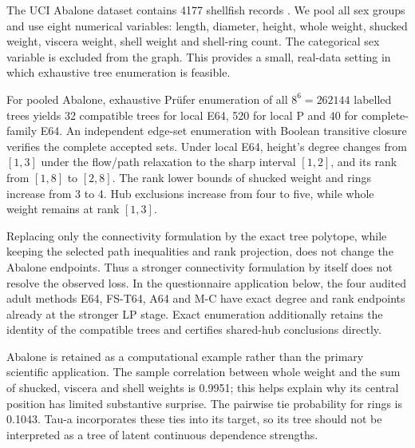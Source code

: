 The UCI Abalone dataset contains 4177 shellfish records \citep{abalone1994}. We pool all sex groups and use eight numerical variables: length, diameter, height, whole weight, shucked weight, viscera weight, shell weight and shell-ring count. The categorical sex variable is excluded from the graph. This provides a small, real-data setting in which exhaustive tree enumeration is feasible.

For pooled Abalone, exhaustive Pr\"ufer enumeration of all $8^6=262144$ labelled trees yields 32 compatible trees for local E64, 520 for local P and 40 for complete-family E64. An independent edge-set enumeration with Boolean transitive closure verifies the complete accepted sets. Under local E64, height's degree changes from $[1,3]$ under the flow/path relaxation to the sharp interval $[1,2]$, and its rank from $[1,8]$ to $[2,8]$. The rank lower bounds of shucked weight and rings increase from 3 to 4. Hub exclusions increase from four to five, while whole weight remains at rank $[1,3]$.

Replacing only the connectivity formulation by the exact tree polytope, while keeping the selected path inequalities and rank projection, does not change the Abalone endpoints. Thus a stronger connectivity formulation by itself does not resolve the observed loss. In the questionnaire application below, the four audited adult methods E64, FS-T64, A64 and M-C have exact degree and rank endpoints already at the stronger LP stage. Exact enumeration additionally retains the identity of the compatible trees and certifies shared-hub conclusions directly.

Abalone is retained as a computational example rather than the primary scientific application. The sample correlation between whole weight and the sum of shucked, viscera and shell weights is 0.9951; this helps explain why its central position has limited substantive surprise. The pairwise tie probability for rings is 0.1043. Tau-a incorporates these ties into its target, so its tree should not be interpreted as a tree of latent continuous dependence strengths.
